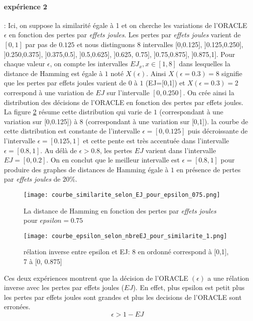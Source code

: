 \paragraph{exp\'erience 2} :
Ici, on suppose la similarit\'e \'egale \`a 1 et on cherche les variations de l'ORACLE $\epsilon$ en fonction des pertes par \textit{effets joules}. 
Les pertes par \textit{effets joules} varient de $[0,1]$ par pas de $0.125$ et nous distinguons $8$ intervalles [0,0.125], ]0.125,0.250], ]0.250,0.375], ]0.375,0.5], ]0.5,0.625], ]0.625, 0.75], ]0.75,0.875], ]0.875,1]. 
Pour chaque valeur $\epsilon$, on compte les intervalles $EJ_x, x \in [1,8]$ dans lesquelles la distance de Hamming est \'egale \`a $1$ not\'e $X(\epsilon)$. Ainsi $X(\epsilon=0.3) = 8$ signifie que  les pertes par effets joules varient de $0$ \`a $1$ (EJ=[0,1]) et $X(\epsilon=0.3) = 2$ correspond \`a une variation de $EJ$ sur l'intervalle $[0,0.250]$.
On cr\'ee ainsi la distribution des d\'ecisions de l'ORACLE en fonction des pertes par effets joules.
La figure \ref{courbeEpsilonEJ}  r\'esume cette distribution qui varie de $1$ (correspondant \`a une variation sur [0,0.125]) \`a $8$ (correspondant \`a une variation sur [0,1]).
la courbe de cette distribution est constante de l'intervalle $\epsilon = [0,0.125]$ puis  d\'ecroissante de l'intervalle $\epsilon =[0.125,1]$ et cette pente est tr\`es accentu\'ee dans l'intervalle $\epsilon = [0.8, 1]$. 
Au d\'el\`a  de $\epsilon > 0.8$, les pertes $EJ$ varient dans l'intervalle $EJ=[0,0.2]$.
On en conclut que le meilleur intervalle est $\epsilon = [0.8, 1]$ pour produire des graphes de distances de Hamming \'egale \`a $1$ en pr\'esence de pertes par \textit{effets joules} de $20\%$.

\begin{figure}
\centering
\texttt{[image: courbe\_similarite\_selon\_EJ\_pour\_epsilon\_075.png]}
\caption{ La distance de Hamming en fonction des pertes par \textit{effets joules} pour $epsilon=0.75$ }
\label {courbeEJCoef}
\end{figure}
\begin{figure}
\centering
\texttt{[image: courbe\_epsilon\_selon\_nbreEJ\_pour\_similarite\_1.png]}
\caption{ r\'elation inverse entre epsilon et EJ: 8 en ordonn\'e correspond \`a [0,1], 7 \`a [0, 0.875] }
\label {courbeEpsilonEJ}
\end{figure}

Ces deux exp\'eriences montrent que la d\'ecision de l'ORACLE $(\epsilon)$ a une r\'elation inverse avec les pertes par effets joules ($EJ$). En effet, plus epsilon est petit plus les pertes par effets joules sont grandes et plus les decisions de l'ORACLE sont erron\'ees.
\begin{equation}
	\epsilon > 1 - EJ
\end{equation}


